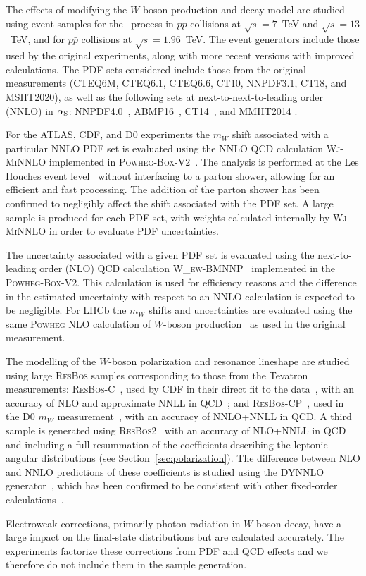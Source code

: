 
The effects of modifying the $W$-boson production and decay model are studied using 
event samples for the \Wlnu~process in $pp$ collisions at $\sqrt{s}=7$~TeV and
$\sqrt{s}=13$~TeV, and for $p\bar{p}$ collisions at $\sqrt{s}=1.96$~TeV.
The event generators include those used by the original experiments, along with more
recent versions with improved calculations.  The PDF sets considered include those
from the original measurements (CTEQ6M, CTEQ6.1, CTEQ6.6, CT10, NNPDF3.1, CT18,
and MSHT2020), as well as the following sets at next-to-next-to-leading order (NNLO) in
$\alpha_{\scriptsize\textrm{S}}$: NNPDF4.0~\cite{NNPDF:2021njg},
ABMP16~\cite{Alekhin:2017kpj}, CT14~\cite{Dulat:2015mca}, and MMHT2014 \cite{Harland-Lang:2014zoa}.

For the ATLAS, CDF, and D0 experiments the $m_W$ shift associated with a particular NNLO PDF set is
evaluated using the NNLO QCD calculation {\textsc{Wj-MiNNLO}} \cite{Monni:2019whf,Monni:2020nks}
implemented in {\textsc{Powheg-Box-V2}}~\cite{Nason:2004rx,Frixione:2007vw,Alioli:2010xd}.  The analysis 
is performed at the Les Houches event level~\cite{Alwall2007} without interfacing to a parton shower,
allowing for an efficient and fast processing.  The addition of the parton shower has been confirmed
to negligibly affect the shift associated with the PDF set.  A large sample is produced for each PDF set,
with weights calculated internally by \textsc{Wj-MiNNLO} in order to evaluate PDF uncertainties. 

The uncertainty associated with a given PDF set is evaluated using the next-to-leading order (NLO) QCD
calculation {\textsc{W\_ew-BMNNP}}~\cite{Barze:2012tt} implemented in the {\textsc{Powheg-Box-V2}}.  
This calculation is used for efficiency reasons and the difference in the estimated uncertainty
with respect to an NNLO calculation is expected to be negligible.
For LHCb the $m_W$ shifts and uncertainties are evaluated using
the same {\textsc{Powheg}} NLO calculation of $W$-boson production~\cite{Alioli:2008gx} as used in the original
measurement.

The modelling of the $W$-boson polarization and resonance lineshape are studied using
large \textsc{ResBos} samples corresponding to those from the Tevatron measurements:
{\textsc{ResBos-C}}~\cite{Balazs:1997xd}, used by CDF in their direct fit to the
data~\cite{CDF:2022hxs}, with an accuracy of NLO and approximate NNLL in
QCD~\cite{Isaacson:2022rts}; and {\textsc{ResBos-CP}}~\cite{Landry:2002ix}, used in the
D0 $m_W$ measurement~\cite{D0:2013jba}, with an accuracy of NNLO+NNLL in QCD.  A third sample is 
generated using {\textsc{ResBos2}}~\cite{Isaacson:2022rts} with an accuracy of NLO+NNLL in QCD and
including a full resummation of the coefficients describing the leptonic angular distributions (see
Section~\ref{sec:polarization}).  The difference between NLO and NNLO predictions of these
coefficients is studied using the DYNNLO generator~\cite{Catani:2007vq,Catani:2009sm}, which has
been confirmed to be consistent with other fixed-order calculations~\cite{comparisons}.

Electroweak corrections, primarily photon radiation in $W$-boson decay, have a large impact on the 
final-state distributions but are calculated accurately.  The experiments factorize these corrections
from PDF and QCD effects and we therefore do not include them in the sample generation.
